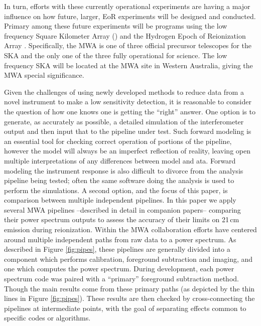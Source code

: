 \documentclass[preprint2]{aastex}
\begin{document}
In turn, efforts with these currently operational experiments are having a major influence on how future, larger, EoR experiments will be designed and conducted.  Primary among these future experiments will be programs using the low frequency Square Kilometer Array (\cite{2014aska.confE...1K}) and the Hydrogen Epoch of Reionization Array \citep[HERA][]{Pober:2014p10390}.  Specifically, the MWA is one of three official precursor telescopes for the SKA and the only one of the three fully operational for science.  The low frequency SKA will be located at the MWA site in Western Australia, giving the MWA special significance.

Given the challenges of using newly developed methods to reduce data from a novel instrument to make a low sensitivity detection, it is reasonable to consider the question of how one knows one is getting the ``right'' answer.  One option is to generate, as accurately as possible, a detailed simulation of the interferometer output and then input that to the pipeline under test.  Such forward modeling is an essential tool for checking correct operation of portions of the pipeline, however the model will always be an imperfect reflection of reality, leaving open multiple interpretations of any differences between model and ata.  Forward modeling the instrument response is also difficult to divorce from the analysis pipeline being tested; often the same software doing the analysis is used to perform the simulations. A second option, and the focus of this paper, is comparison between multiple independent pipelines.%
In this paper we apply several MWA pipelines --described in detail in companion papers-- comparing their power spectrum outputs to assess the accuracy of their limits on 21\,cm emission during reionization.  Within the MWA collaboration efforts have centered around multiple independent paths from raw data to a power spectrum.  As described in Figure \ref{fig:pipes}, these pipelines are generally divided into a component which performs calibration, foreground subtraction and imaging, and one which computes the power spectrum.  During development, each power spectrum code was paired with a ``primary'' foreground subtraction method.  Though the main results come from these primary paths (as depicted by the thin lines in Figure \ref{fig:pipes}). These results are then checked by cross-connecting the pipelines at intermediate points, with the goal of separating effects common to specific codes or algorithms.
\end{document}
